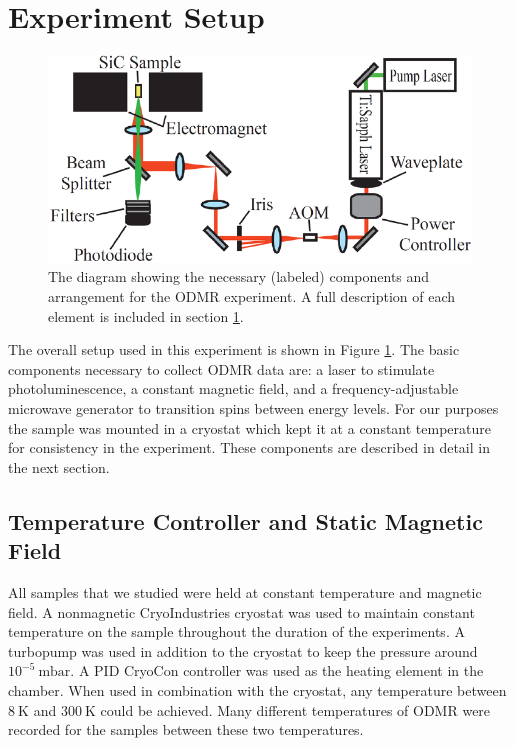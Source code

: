 \documentclass[oneside]{BYUPhys}
\begin{document}
\section{Experiment Setup}
\label{sec:Experiment}

\begin{figure}
    \centerline{\includegraphics{setup_fig}}
    \caption[Diagram of Experimental Setup for ODMR]{\label{fig:setup}
     The diagram showing the necessary (labeled) components and arrangement for the ODMR experiment. A full description of each element is included in section \ref{sec:Experiment}.}
 \end{figure}

The overall setup used in this experiment is shown in Figure \ref{fig:setup}. The basic components necessary to collect ODMR data are: a laser to stimulate photoluminescence, a constant magnetic field, and a frequency-adjustable microwave generator to transition spins between energy levels. For our purposes the sample was mounted in a cryostat which kept it at a constant temperature for consistency in the experiment. These components are described in detail in the next section.

\subsection{Temperature Controller and Static Magnetic Field}

All samples that we studied were held at constant temperature and magnetic field. A nonmagnetic CryoIndustries cryostat was used to maintain constant temperature on the sample throughout the duration of the experiments. A turbopump was used in addition to the cryostat to keep the pressure around $10^{-5}~\text{mbar}$. A PID CryoCon controller was used as the heating element in the chamber. When used in combination with the cryostat, any temperature between $8~\text{K}$ and $300~\text{K}$ could be achieved. Many different temperatures of ODMR were recorded for the samples between these two temperatures.
\end{document}
